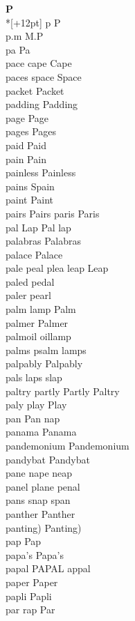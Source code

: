 \vspace{14pt}
\noindent\textbf{\Large P}\\*[+12pt]
p P\\
p.m M.P\\
pa Pa\\
pace cape Cape\\
paces space Space\\
packet Packet\\
padding Padding\\
page Page\\
pages Pages\\
paid Paid\\
pain Pain\\
painless Painless\\
pains Spain\\
paint Paint\\
pairs Pairs paris Paris\\
pal Lap Pal lap\\
palabras Palabras\\
palace Palace\\
pale peal plea leap Leap\\
paled pedal\\
paler pearl\\
palm lamp Palm\\
palmer Palmer\\
palmoil oillamp\\
palms psalm lamps\\
palpably Palpably\\
pals laps slap\\
paltry partly Partly Paltry\\
paly play Play\\
pan Pan nap\\
panama Panama\\
pandemonium Pandemonium\\
pandybat Pandybat\\
pane nape neap\\
panel plane penal\\
pans snap span\\
panther Panther\\
panting) Panting)\\
pap Pap\\
papa's Papa's\\
papal PAPAL appal\\
paper Paper\\
papli Papli\\
par rap Par\\
